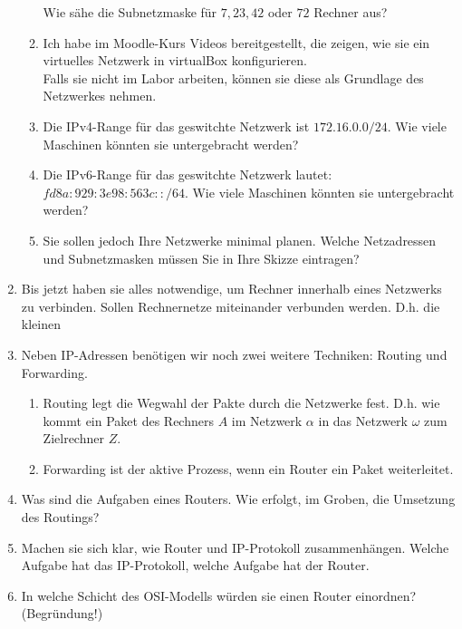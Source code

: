 \documentclass[paper=a4,fontsize=11pt]{scrartcl}%
\numberwithin{equation}{section}
\begin{document}
\begin{enumerate}
\begin{enumerate}
		Wie sähe die Subnetzmaske für $7, 23, 42$ oder $72$ Rechner aus? 
		\item Ich habe im Moodle-Kurs Videos bereitgestellt, die zeigen, wie sie ein virtuelles Netzwerk in virtualBox konfigurieren.\\
		Falls sie nicht im Labor arbeiten, können sie diese als Grundlage des Netzwerkes nehmen.
		\item Die IPv4-Range für das geswitchte Netzwerk ist $172.16.0.0/24$. Wie viele Maschinen könnten sie untergebracht werden? 
		\item Die IPv6-Range für das geswitchte Netzwerk lautet: $fd8a:929:3e98:563c::/64$. Wie viele Maschinen könnten sie untergebracht werden?
		\item Sie sollen jedoch Ihre Netzwerke minimal planen. Welche Netzadressen und Subnetzmasken müssen Sie in Ihre Skizze eintragen?
	\end{enumerate}
	\item Bis jetzt haben sie alles notwendige, um Rechner innerhalb eines Netzwerks zu verbinden. Sollen Rechnernetze miteinander verbunden werden. D.h. die kleinen
		\item Neben IP-Adressen benötigen wir noch zwei weitere Techniken: Routing und Forwarding.
		\begin{enumerate}
			\item Routing legt die Wegwahl der Pakte durch die Netzwerke fest. D.h. wie kommt ein Paket des Rechners $A$ im Netzwerk $\alpha$ in das Netzwerk $\omega$ zum Zielrechner $Z$.\\
			\item Forwarding ist der aktive Prozess, wenn ein Router ein Paket weiterleitet.
		\end{enumerate}
		\item Was sind die Aufgaben eines Routers. Wie erfolgt, im Groben, die Umsetzung des Routings?
	\item Machen sie sich klar, wie Router und IP-Protokoll zusammenhängen. Welche Aufgabe hat das IP-Protokoll, welche Aufgabe hat der Router.
	\item In welche Schicht des OSI-Modells würden sie einen Router einordnen? (Begründung!)
\end{enumerate}
\end{document}
